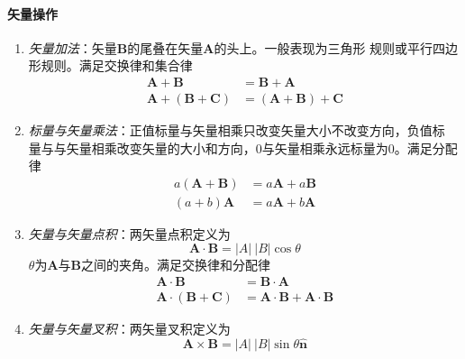 \paragraph*{矢量操作}
\begin{enumerate}
    \item \textit{矢量加法}：矢量$\bm{B}$的尾叠在矢量$\bm{A}$的头上。一般表现为三角形
          规则或平行四边形规则。满足交换律和集合律
          \begin{align}
              \bm{A} + \bm{B} &= \bm{B} + \bm{A}
                                          \label{eq:vec-vec-add-exchang} \\
              \bm{A} + (\bm{B} + \bm{C}) &= (\bm{A} + \bm{B}) + \bm{C}
                                          \label{eq:vec-vec-add-combine}
          \end{align}
    \item \textit{标量与矢量乘法}：正值标量与矢量相乘只改变矢量大小不改变方向，负值标
          量与与矢量相乘改变矢量的大小和方向，$0$与矢量相乘永远标量为0。满足分配律
          \begin{equation}
              \begin{aligned}
                  a(\bm{A} + \bm{B}) &= a\bm{A} + a\bm{B} \\
                  (a + b) \bm{A}     &= a\bm{A} + b\bm{A}
              \end{aligned}
            \label{eq:vec-distri}
          \end{equation}
    \item \textit{矢量与矢量点积}：两矢量点积定义为
           \begin{equation}
            \bm{A} \cdot \bm{B} = |A|\ |B|\cos{\theta}
            \label{eq:vec-dotproduct}
           \end{equation}
           $\theta$为$\bm{A}$与$\bm{B}$之间的夹角。满足交换律和分配律
           \begin{align}
               \bm{A} \cdot \bm{B} &= \bm{B} \cdot \bm{A}
                                           \label{eq:vec-vec-dot-exchange}   \\
               \bm{A} \cdot (\bm{B} + \bm{C}) &= \bm{A} \cdot \bm{B} + \bm{A} 
                                                 \cdot \bm{B}
                                           \label{eq:vec-vec-dot-distri}
           \end{align}
    \item \textit{矢量与矢量叉积}：两矢量叉积定义为
          \begin{equation}
              \bm{A} \times \bm{B} = |A|\ |B|\sin{\theta} \hat{\bm{n}}

\end{equation}
\end{enumerate}
